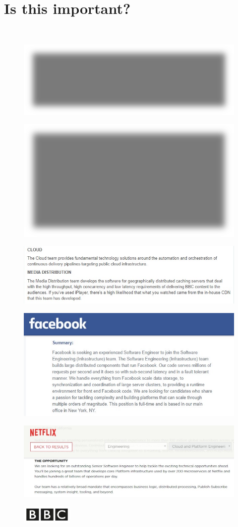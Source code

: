 \documentclass[12pt]{article}
\begin{document}
\section{Is this important?}
\\
\begin{figure}[H]
\includegraphics[width=0.5\linewidth]{page12-image-1.png}
\end{figure}
\begin{figure}[H]
\includegraphics[width=0.5\linewidth]{page12-image-2.png}
\end{figure}
\begin{figure}[H]
\includegraphics[width=0.5\linewidth]{page12-image-3.png}
\end{figure}
\begin{figure}[H]
\includegraphics[width=0.5\linewidth]{page12-image-4.png}
\end{figure}
\begin{figure}[H]
\includegraphics[width=0.5\linewidth]{page12-image-5.png}
\end{figure}
\begin{figure}[H]
\includegraphics[width=0.5\linewidth]{page12-image-6.png}
\end{figure}
\end{document}
